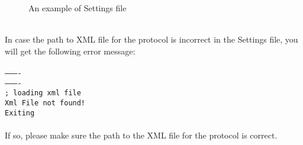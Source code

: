\begin{figure}[h]
  \begin{center}
  \end{center}
\caption{An example of Settings file}\label{fig:settings}
\end{figure}
\\
In case the path to XML file for the protocol is incorrect in the Settings file, you will get the following error message:\\\\
{\tt ----------\\
----------\\
; loading xml file\\
Xml File not found!\\
Exiting\\}
\\
If so, please make sure the path to the XML file for the protocol is correct.

